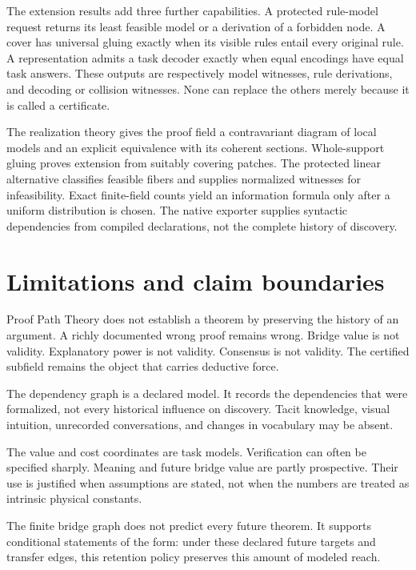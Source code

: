 \documentclass[11pt,oneside]{article}
\theoremstyle{komorebiplain}
\theoremstyle{komorebidefinition}
\theoremstyle{komorebiremark}
\begin{document}
The extension results add three further capabilities. A protected rule-model request returns its least feasible model or a derivation of a forbidden node. A cover has universal gluing exactly when its visible rules entail every original rule. A representation admits a task decoder exactly when equal encodings have equal task answers. These outputs are respectively model witnesses, rule derivations, and decoding or collision witnesses. None can replace the others merely because it is called a certificate.


\noindent The realization theory gives the proof field a contravariant diagram of local models and an explicit equivalence with its coherent sections. Whole-support gluing proves extension from suitably covering patches. The protected linear alternative classifies feasible fibers and supplies normalized witnesses for infeasibility. Exact finite-field counts yield an information formula only after a uniform distribution is chosen. The native exporter supplies syntactic dependencies from compiled declarations, not the complete history of discovery.


\section{Limitations and claim boundaries}
\label{sec:old27}

Proof Path Theory does not establish a theorem by preserving the history of an argument. A richly documented wrong proof remains wrong. Bridge value is not validity. Explanatory power is not validity. Consensus is not validity. The certified subfield remains the object that carries deductive force.

The dependency graph is a declared model. It records the dependencies that were formalized, not every historical influence on discovery. Tacit knowledge, visual intuition, unrecorded conversations, and changes in vocabulary may be absent.

The value and cost coordinates are task models. Verification can often be specified sharply. Meaning and future bridge value are partly prospective. Their use is justified when assumptions are stated, not when the numbers are treated as intrinsic physical constants.

The finite bridge graph does not predict every future theorem. It supports conditional statements of the form: under these declared future targets and transfer edges, this retention policy preserves this amount of modeled reach.
\end{document}
